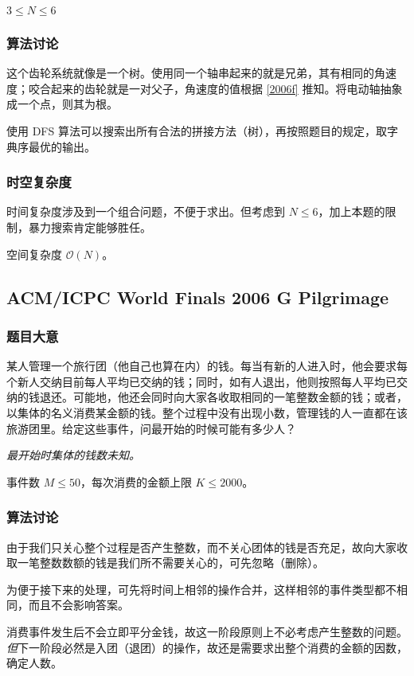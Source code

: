 				$3 \le N \le 6$
			\subsubsection{算法讨论}
				这个齿轮系统就像是一个树。使用同一个轴串起来的就是兄弟，其有相同的角速度；咬合起来的齿轮就是一对父子，角速度的值根据 \eqref{2006f} 推知。将电动轴抽象成一个点，则其为根。
				
				使用 DFS 算法可以搜索出所有合法的拼接方法（树），再按照题目的规定，取字典序最优的输出。

			\subsubsection{时空复杂度}
				时间复杂度涉及到一个组合问题，不便于求出。但考虑到 $N \le 6$，加上本题的限制，暴力搜索肯定能够胜任。
				
				空间复杂度 $\mathcal{O}\left(N\right)$。
			
		\newpage
		\subsection{ACM/ICPC World Finals 2006 G Pilgrimage}
			\subsubsection{题目大意}
				某人管理一个旅行团（他自己也算在内）的钱。每当有新的人进入时，他会要求每个新人交纳目前每人平均已交纳的钱；同时，如有人退出，他则按照每人平均已交纳的钱退还。可能地，他还会同时向大家各收取相同的一笔整数金额的钱；或者，以集体的名义消费某金额的钱。整个过程中没有出现小数，管理钱的人一直都在该旅游团里。给定这些事件，问最开始的时候可能有多少人？
				
				\emph{最开始时集体的钱数未知。}
				
				事件数 $M \le 50$，每次消费的金额上限 $K \le \num{2000}$。
			\subsubsection{算法讨论}
				由于我们只关心整个过程是否产生整数，而不关心团体的钱是否充足，故向大家收取一笔整数数额的钱是我们所不需要关心的，可先忽略（删除）。
				
				为便于接下来的处理，可先将时间上相邻的操作合并，这样相邻的事件类型都不相同，而且不会影响答案。
				
				消费事件发生后不会立即平分金钱，故这一阶段原则上不必考虑产生整数的问题。\emph{但}下一阶段必然是入团（退团）的操作，故还是需要求出整个消费的金额的因数，确定人数。
				
